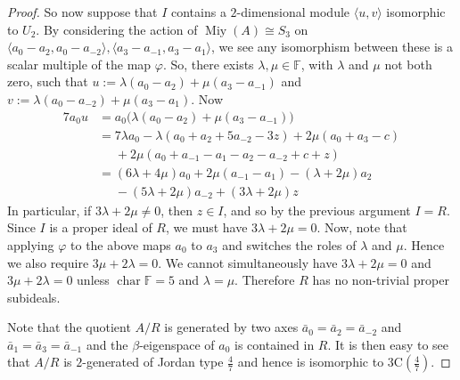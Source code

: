 \documentclass[10pt,a4paper]{amsart}
\newcommand{\C}{\mathrm{C}}
\newcommand\FF{\mathbb{F}}
\DeclareMathOperator{\Miy}{Miy}
\newcommand\bt{\beta}
\DeclareMathOperator{\ch}{char}
\newcommand\la{\langle}
\newcommand\lm{\lambda}
\renewcommand{\phi}{\varphi}
\newcommand\ra{\rangle}
\begin{document}
\begin{proof}
So now suppose that $I$ contains a $2$-dimensional module $\la u , v \ra$ isomorphic to $U_2$.  By considering the action of $\Miy(A) \cong S_3$ on $\langle a_0 - a_2, a_0 - a_{-2} \rangle, \langle a_3 - a_{-1}, a_3 - a_1 \rangle$, we see any isomorphism between these is a scalar multiple of the map $\phi$.  So, there exists $\lm, \mu \in \mathbb{F}$, with $\lm$ and $\mu$ not both zero, such that $u := \lambda(a_0 - a_2) + \mu(a_3 - a_{-1})$ and $v :=  \lambda(a_0 - a_{-2}) + \mu(a_3 - a_1)$.  Now
\begin{align*}
7a_0 u &= a_0 \big( \lambda(a_0 - a_2) + \mu(a_3 - a_{-1}) \big) \\
&=  7\lambda a_0 - \lambda \left(a_0 + a_2 + 5a_{-2} - 3z \right) + 2\mu \left(a_0 + a_3 - c\right) \\
&\phantom{{}={}} + 2\mu \left(a_0 + a_{-1} - a_1 - a_2 - a_{-2} + c + z\right) \\
&= (6\lm + 4 \mu)a_0 +2\mu (a_{-1} - a_1) - (\lm + 2\mu) a_2 \\ 
&\phantom{{}={}} - (5\lm + 2\mu) a_{-2} + (3\lm + 2\mu) z
\end{align*}
In particular, if $3\lambda + 2\mu \neq 0$, then $z \in I$, and so by the previous argument $I = R$.  Since $I$ is a proper ideal of $R$, we must have $3\lambda + 2\mu = 0$.
Now, note that applying $\phi$ to the above maps $a_0$ to $a_3$ and switches the roles of $\lambda$ and $\mu$.  Hence we also require $3\mu + 2\lm = 0$.  We cannot simultaneously have $3\lm + 2\mu = 0$ and $3\mu + 2\lm = 0$ unless $\ch \FF = 5$ and $\lm = \mu$.  Therefore $R$ has no non-trivial proper subideals.

Note that the quotient $A/R$ is generated by two axes $\bar{a}_0 = \bar{a}_2 = \bar{a}_{-2}$ and $\bar{a}_1 = \bar{a}_3 = \bar{a}_{-1}$ and the $\bt$-eigenspace of $a_0$ is contained in $R$.  It is then easy to see that $A/R$ is $2$-generated of Jordan type $\frac{4}{7}$ and hence is isomorphic to $3\C(\frac{4}{7})$.
\end{proof}
\end{document}
